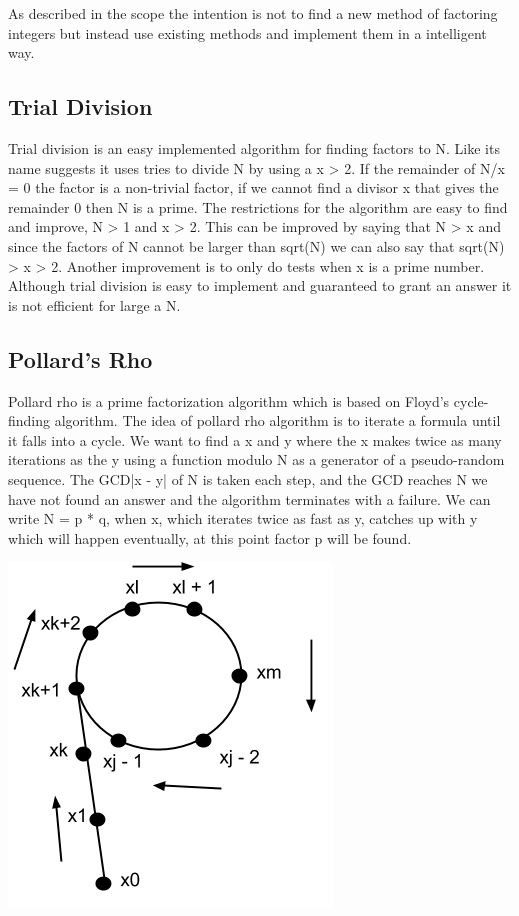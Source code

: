 As described in the scope the intention is not to find a new method of factoring integers but instead use existing methods and implement them in a intelligent way.

\subsection{Trial Division}
Trial division is an easy implemented algorithm for finding factors to N. Like its name suggests it uses tries to divide N by using a x > 2. If the remainder of N/x = 0 the factor is a non-trivial factor, if we cannot find a divisor x that gives the remainder 0 then N is a prime.
The restrictions for the algorithm are easy to find and improve, N > 1 and x > 2. This can be improved by saying that N > x and since the factors of N cannot be larger than sqrt(N) we can also say that sqrt(N) > x > 2. Another improvement is to only do tests when x is a prime number. Although trial division is easy to implement and guaranteed to grant an answer it is not efficient for large a N.

\subsection{Pollard's Rho}
Pollard rho is a prime factorization algorithm which is based on Floyd’s cycle-finding algorithm. The idea of pollard rho algorithm is to iterate a formula until it falls into a cycle. We want to find a x and y where the x makes twice as many iterations as the y using a function modulo N as a generator of a pseudo-random sequence. The GCD|x - y| of N is taken each step, and the GCD reaches N we have not found an answer and the algorithm terminates with a failure.
We can write N = p * q, when x, which iterates twice as fast as y, catches up with y which will happen eventually, at this point factor p will be found. \cite{avalg}

\includegraphics[scale = 0.5]{pollards.png}